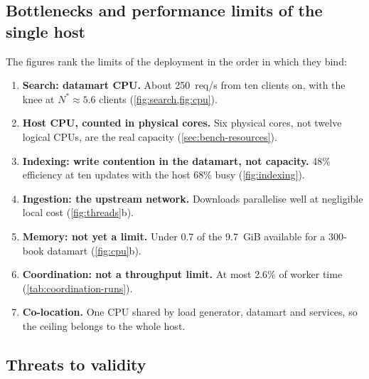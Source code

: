 \documentclass[10pt,a4paper]{article}
\begin{document}
\subsection{Bottlenecks and performance limits of the single host}
\label{sec:bench-limits}

The figures rank the limits of the deployment in the order in which they bind:

\begin{enumerate}
  \item \textbf{Search: datamart CPU.} About 250~req/s from ten clients on,
  with the knee at $N^{*} \approx 5.6$ clients (\cref{fig:search,fig:cpu}).
  \item \textbf{Host CPU, counted in physical cores.} Six physical cores, not
  twelve logical CPUs, are the real capacity (\cref{sec:bench-resources}).
  \item \textbf{Indexing: write contention in the datamart, not capacity.} 48\%
  efficiency at ten updates with the host 68\% busy (\cref{fig:indexing}).
  \item \textbf{Ingestion: the upstream network.} Downloads parallelise well at
  negligible local cost (\cref{fig:threads}b).
  \item \textbf{Memory: not yet a limit.} Under 0.7 of the 9.7~GiB available
  for a 300-book datamart (\cref{fig:cpu}b).
  \item \textbf{Coordination: not a throughput limit.} At most 2.6\% of worker
  time (\cref{tab:coordination-runs}).
  \item \textbf{Co-location.} One CPU shared by load generator, datamart and
  services, so the ceiling belongs to the whole host.
\end{enumerate}

\subsection{Threats to validity}
\label{sec:validity}
\end{document}
